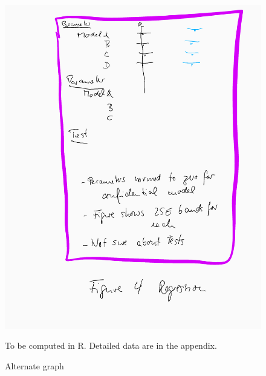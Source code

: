 \begin{figure} [H]
\centering
\label{tab:all:estimates}
\includegraphics[width=.8\linewidth]{graphs/Figure4-placeholder.png} 
\caption{Alternate graph} 
\begin{minipage}{0.48\linewidth}
{\footnotesize To be computed in R. Detailed data are in the appendix. \par}
\end{minipage}
\end{figure}